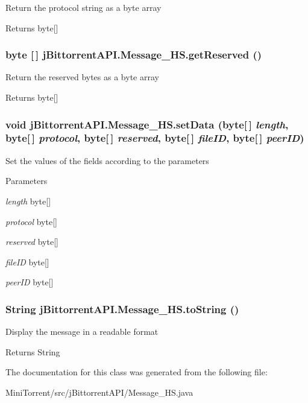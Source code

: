 \label{classj_bittorrent_a_p_i_1_1_message___h_s_a16053a0dcd33bc941bb0e6c173ccea79}
Return the protocol string as a byte array \begin{DoxyReturn}{Returns}
byte\mbox{[}\mbox{]} 
\end{DoxyReturn}
\hypertarget{classj_bittorrent_a_p_i_1_1_message___h_s_acd526d44eed4c9a99e428024e7648890}{
\subsubsection[{getReserved}]{\setlength{\rightskip}{0pt plus 5cm}byte \mbox{[}$\,$\mbox{]} jBittorrentAPI.Message\_\-HS.getReserved ()}}
\label{classj_bittorrent_a_p_i_1_1_message___h_s_acd526d44eed4c9a99e428024e7648890}
Return the reserved bytes as a byte array \begin{DoxyReturn}{Returns}
byte\mbox{[}\mbox{]} 
\end{DoxyReturn}
\hypertarget{classj_bittorrent_a_p_i_1_1_message___h_s_a97ccea86b2ccb3f20badf4ea3952d247}{
\subsubsection[{setData}]{\setlength{\rightskip}{0pt plus 5cm}void jBittorrentAPI.Message\_\-HS.setData (byte\mbox{[}$\,$\mbox{]} {\em length}, \/  byte\mbox{[}$\,$\mbox{]} {\em protocol}, \/  byte\mbox{[}$\,$\mbox{]} {\em reserved}, \/  byte\mbox{[}$\,$\mbox{]} {\em fileID}, \/  byte\mbox{[}$\,$\mbox{]} {\em peerID})}}
\label{classj_bittorrent_a_p_i_1_1_message___h_s_a97ccea86b2ccb3f20badf4ea3952d247}
Set the values of the fields according to the parameters 
\begin{DoxyParams}{Parameters}
\item[{\em length}]byte\mbox{[}\mbox{]} \item[{\em protocol}]byte\mbox{[}\mbox{]} \item[{\em reserved}]byte\mbox{[}\mbox{]} \item[{\em fileID}]byte\mbox{[}\mbox{]} \item[{\em peerID}]byte\mbox{[}\mbox{]} \end{DoxyParams}
\hypertarget{classj_bittorrent_a_p_i_1_1_message___h_s_ae98c9d701d858087fd3b75df247b1ca9}{
\subsubsection[{toString}]{\setlength{\rightskip}{0pt plus 5cm}String jBittorrentAPI.Message\_\-HS.toString ()}}
\label{classj_bittorrent_a_p_i_1_1_message___h_s_ae98c9d701d858087fd3b75df247b1ca9}
Display the message in a readable format \begin{DoxyReturn}{Returns}
String 
\end{DoxyReturn}


The documentation for this class was generated from the following file:\begin{DoxyCompactItemize}
\item 
MiniTorrent/src/jBittorrentAPI/Message\_\-HS.java\end{DoxyCompactItemize}
